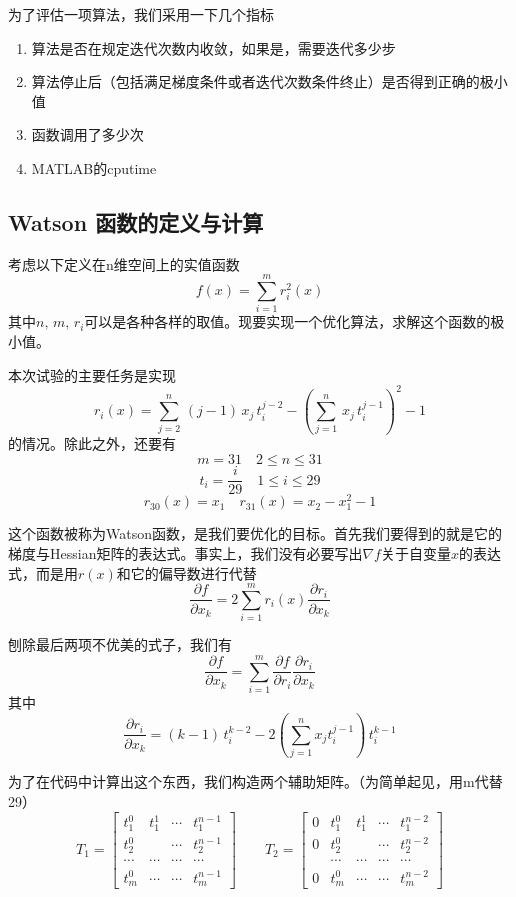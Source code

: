 \documentclass[11pt, a4paper]{article}
\begin{document}
为了评估一项算法，我们采用一下几个指标
\begin{enumerate}
	\item 算法是否在规定迭代次数内收敛，如果是，需要迭代多少步
	\item 算法停止后（包括满足梯度条件或者迭代次数条件终止）是否得到正确的极小值
	\item 函数调用了多少次
	\item MATLAB的cputime
\end{enumerate}

\subsection{Watson 函数的定义与计算}
考虑以下定义在n维空间上的实值函数\[f(x)=\sum_{i=1}^m r_i^2(x)\]其中$n,\,m,\,r_i$可以是各种各样的取值。现要实现一个优化算法，求解这个函数的极小值。

本次试验的主要任务是实现\[r_i(x)=\sum_{j=2}^n\,(j-1)\,x_j\,t_i^{j-2}-\left(\sum_{j=1}^n\,x_j\,t_i^{j-1}\right)^2-1\]的情况。除此之外，还要有
\[m=31\quad 2\le n\le 31\]
\[t_i=\frac{i}{29}\quad 1\le i\le 29\]
\[r_{30}(x)=x_1\quad r_{31}(x)=x_2-x_1^2-1\]

这个函数被称为Watson函数\cite{dennis1996numerical}，是我们要优化的目标。首先我们要得到的就是它的梯度与Hessian矩阵的表达式。事实上，我们没有必要写出$\nabla f$关于自变量$x$的表达式，而是用$r(x)$和它的偏导数进行代替
\[\frac{\partial f}{\partial x_k}=2\sum_{i=1}^m r_i(x)\frac{\partial r_i}{\partial x_k}\]

刨除最后两项不优美的式子，我们有
\[\frac{\partial f}{\partial x_k}=\sum_{i=1}^m\frac{\partial f}{\partial r_i}\frac{\partial r_i}{\partial x_k}\]
其中
\[\frac{\partial r_i}{\partial x_k}=(k-1)\,t_i^{k-2}-2\left(\sum_{j=1}^nx_jt_i^{j-1}\right)\,t_i^{k-1}\]

为了在代码中计算出这个东西，我们构造两个辅助矩阵。（为简单起见，用m代替29）
\begin{equation*}
T_1=
\begin{bmatrix}
t_1^0 & t_1^1 & \cdots & t_1^{n-1}\\
t_2^0 & & \cdots & t_2^{n-1}\\
\cdots & \cdots &\cdots & \cdots\\
t_m^0 & \cdots &\cdots & t_m^{n-1}
\end{bmatrix}
\qquad 
T_2=
\begin{bmatrix}
0 & t_1^0 & t_1^1 & \cdots & t_1^{n-2}\\
0 & t_2^0 & & \cdots & t_2^{n-2}\\
& \cdots & \cdots &\cdots & \cdots\\
0 & t_m^0 & \cdots &\cdots & t_m^{n-2}
\end{bmatrix}
\end{equation*}
\end{document}
